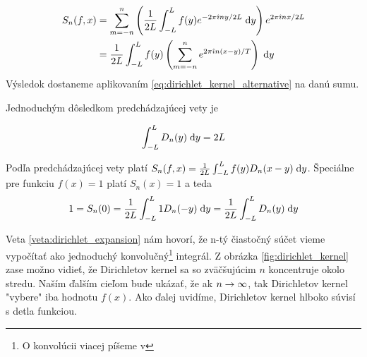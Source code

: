 \begin{dokaz}
    \begin{equation}
    \begin{split}
        S_n(f,x) &= \sum_{m=-n}^{n} \left(
            \frac{1}{2L} \int_{-L}^{L} f(y) e^{-2\pi\hat{\imath} n y/2L} \; \mathrm{d} y
            \right) 
                e^{2\pi\hat{\imath} n x/2L} \\
            &= \frac{1}{2L} \int_{-L}^{L} f(y) \left(
                    \sum_{m=-n}^{n} e^{2\pi\hat{\imath} n (x-y)/T}
                \right) \; \mathrm{d} y \\
    \end{split}
    \end{equation}
    Výsledok dostaneme aplikovaním
    \ref{eq:dirichlet_kernel_alternative} na danú sumu.
\end{dokaz}

Jednoduchým dôsledkom predchádzajúcej vety je
\begin{lema}
    \begin{equation}
        \int_{-L}^{L} D_n(y) \; \mathrm{d} y = 2L
    \end{equation}
\end{lema}
\begin{dokaz}
    Podľa predchádzajúcej vety platí 
    $S_n(f,x) = \frac{1}{2L} \int_{-L}^{L} f(y) D_n(x-y) \; \mathrm{d} y$.
    Špeciálne pre funkciu $f(x)=1$ platí $S_n(x)=1$ a teda
    \begin{equation}
        1=S_n(0) = \frac{1}{2L} \int_{-L}^{L} 1 D_n(-y) \; \mathrm{d} y =
            \frac{1}{2L} \int_{-L}^{L} D_n(y) \; \mathrm{d} y
    \end{equation}
    \label{lema:dirichlet_kernel_integration}
\end{dokaz}

Veta \ref{veta:dirichlet_expansion} nám hovorí, že n-tý čiastočný
súčet vieme vypočítať ako jednoduchý konvolučný\footnote{O konvolúcii
viacej píšeme v \todo{}} integrál.
Z obrázka \ref{fig:dirichlet_kernel} zase možno vidieť, že
Dirichletov kernel sa so zväčšujúcim $n$ koncentruje okolo stredu.
Naším ďalším cieľom bude ukázať, že ak $n\rightarrow \infty$, tak
Dirichletov kernel "vybere" iba hodnotu $f(x)$.
Ako ďalej uvidíme, Dirichletov kernel hlboko súvisí s 
detla funkciou.
